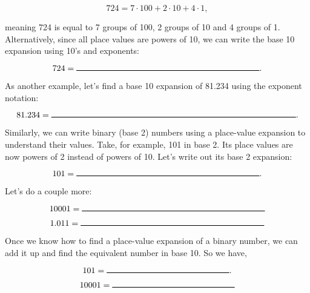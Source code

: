 \documentclass{article}
\begin{document}
\vspace{0.2in}


\[724 = 7\cdot 100 + 2\cdot 10 + 4\cdot 1,\]

\noindent meaning 724 is equal to 7 groups of 100, 2 groups of 10 and 4 groups of 1. Alternatively, since all place values are powers of 10, we can write the base 10 expansion using 10's and exponents:

\vspace{0.2in}

\[724 = \rule{3in}{.01in}.\]

\vspace{0.2in} 

As another example, let's find a base 10 expansion of 81.234 using the exponent notation:

\vspace{0.2in}

\[81.234 = \rule{4in}{.01in}.\]


\vspace{0.2in}

Similarly, we can write binary (base 2) numbers using a place-value expansion to understand their values. Take, for example, 101 in base 2. Its place values are now powers of 2 instead of powers of 10. Let's write out its base 2 expansion:

\vspace{0.2in}

\[101 = \rule{3in}{.01in}.\]

\vspace{0.2in} 

Let's do a couple more:

\vspace{0.2in}

\[10001 = \rule{3in}{.01in}\]

\vspace{0.2in} 

\[1.011 = \rule{3in}{.01in}\]

\vspace{0.2in} 

Once we know how to find a place-value expansion of a binary number, we can add it up and find the equivalent number in base 10.  So we have,

\vspace{0.2in}

\[101 = \rule{2in}{.01in}.\]

\vspace{0.2in}

\[10001 = \rule{2in}{.01in}\]
\end{document}
